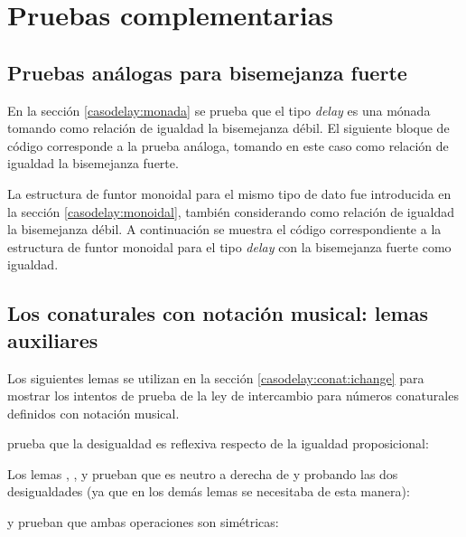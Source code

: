 \chapter{Pruebas complementarias}\label{apendice:pruebas}

\section{Pruebas análogas para bisemejanza fuerte}\label{apendice:fuerte}
 
En la sección \ref{casodelay:monada} se prueba que el tipo \textit{delay} es una mónada tomando como relación de igualdad la bisemejanza débil. El siguiente bloque de código corresponde a la prueba análoga, tomando en este caso como relación de igualdad la bisemejanza fuerte. 


La estructura de funtor monoidal para el mismo tipo de dato fue introducida en la sección \ref{casodelay:monoidal}, también considerando como relación de igualdad la bisemejanza débil. A continuación se muestra el código correspondiente a la estructura de funtor monoidal para el tipo \textit{delay} con la bisemejanza fuerte como igualdad.


\section{Los conaturales con notación musical: lemas auxiliares}\label{apendice:lemasmus}

Los siguientes lemas se utilizan en la sección \ref{casodelay:conat:ichange} para mostrar los intentos de prueba de la ley de intercambio para números conaturales definidos con notación musical. 

\AgdaFunction{$\equiv\Rightarrow\gtrsim$} prueba que la desigualdad es reflexiva respecto de la igualdad proposicional:

Los lemas , ,  y  prueban que  es neutro a derecha de  y  probando las dos desigualdades (ya que en los demás lemas se necesitaba de esta manera):

 y  prueban que ambas operaciones son simétricas:

